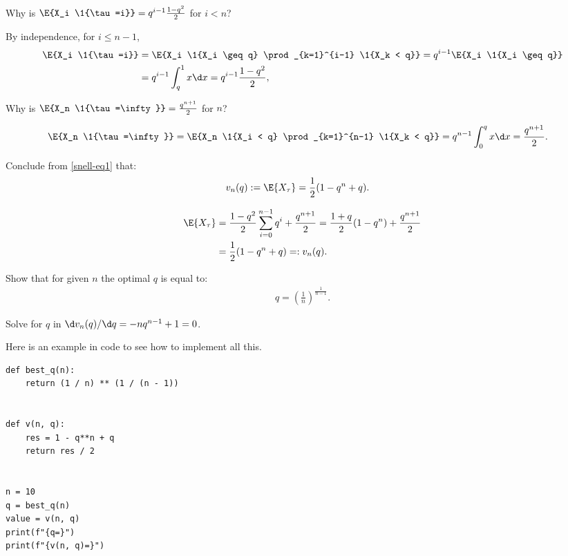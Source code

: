 \documentclass[a4paper]{article}
\begin{document}
\begin{exercise}
Why is \(\E{X_i \1{\tau=i}} = q^{i-1} \frac{1-q^{2}}{2}\) for \(i < n\)?
\begin{solution}
By independence, for \(i\leq n-1\),
\begin{align*}
\E{X_i \1{\tau=i}} &= \E{X_i \1{X_i \geq q} \prod_{k=1}^{i-1} \1{X_k < q}}  = q^{i-1} \E{X_i \1{X_i \geq q}} \\
&= q^{i-1} \int_q^1 x \d x = q^{i-1} \frac{1-q^{2}}{2},
\end{align*}
\end{solution}
\end{exercise}
\begin{exercise}
Why is  \(\E{X_n \1{\tau=\infty}}= \frac{q^{n+1}}2\) for \(n\)?
\begin{solution}
\begin{align*}
\E{X_n \1{\tau=\infty}} &= \E{X_n \1{X_i < q} \prod_{k=1}^{n-1} \1{X_k < q}}  = q^{n-1} \int_0^q x \d x = \frac{q^{n+1}}2.
\end{align*}
\end{solution}
\end{exercise}
\begin{exercise}
Conclude  from \cref{snell-eq1} that:
\begin{align*}
v_{n}(q) := \E{X_{\tau}} &= \frac{1}{2}(1-q^{n} + q).
\end{align*}
\begin{solution}
\begin{align*}
\E{X_{\tau}} &= \frac{1-q^{2}}{2} \sum_{i=0}^{n-1} q^{i}  + \frac{q^{n+1}}2 = \frac{1+q}{2} (1-q^{n}) +  \frac{q^{n+1}}2 \\
&= \frac{1}{2}(1-q^{n} + q) =: v_n(q).
\end{align*}
\end{solution}
\end{exercise}
\begin{exercise}
Show that for given \(n\) the optimal \(q\) is equal to:
\begin{align*}
q = \left({\frac{1}{n}}\right)^{\frac{1}{n-1}}.
\end{align*}
\begin{solution}
Solve for \(q\) in \(\d v_n(q)/ \d q = -n q^{n-1} + 1 = 0\).
\end{solution}
\end{exercise}

Here is an example in code to see how to implement all this.


\begin{verbatim}
def best_q(n):
    return (1 / n) ** (1 / (n - 1))


def v(n, q):
    res = 1 - q**n + q
    return res / 2


n = 10
q = best_q(n)
value = v(n, q)
print(f"{q=}")
print(f"{v(n, q)=}")
\end{verbatim}
\end{document}
